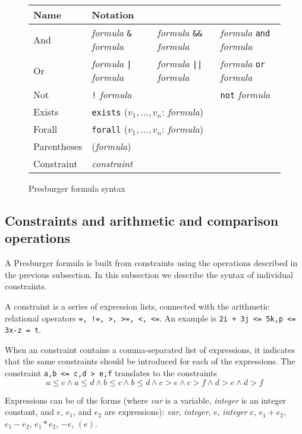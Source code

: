\begin{figure}[tbh]
\begin{tabular}{l|lll}
Name & \multicolumn{3}{l}{Notation} \\\hline

And & {\em formula} {\tt \&} {\em formula} & {\em formula} {\tt \&\&} {\em formula} & {\em formula} {\tt and} {\em formula} \\

Or  & {\em formula} {\tt |} {\em formula}  & {\em formula} {\tt ||} {\em formula}   & {\em formula} {\tt or} {\em formula} \\

Not & {\tt !} {\em formula}  &                    & {\tt not} {\em formula}\\

Exists & \multicolumn{3}{l}{{\tt exists} ($v_1,...,v_n$: {\em formula})} \\

Forall & \multicolumn{3}{l}{{\tt forall} ($v_1,...,v_n$: {\em formula})} \\

Parentheses & ({\em formula}) \\
Constraint & {\em constraint} \\
\end{tabular}
\caption{Presburger formula syntax}
\label{FormulaOps}
\end{figure}


\subsection{Constraints and arithmetic and comparison operations}

A Presburger formula is built from constraints using the operations
described in the previous subsection.  In this subsection we describe
the syntax of individual constraints.

A constraint is a series of expression lists, connected with
the arithmetic relational operators {\tt =, !=, >, >=, <, <=}.
An example is {\tt 2i + 3j <= 5k,p <= 3x-z = t}.

When an constraint contains a comma-separated list of expressions, it
indicates that the same constraints should be introduced for each of
the expressions.  The constraint {\tt a,b <= c,d > e,f} translates to
the constraints
$$a \leq c \land a \leq d \land b \leq c \land b \leq d \land 
c > e \land c > f \land d > e \land d > f$$

Expressions can be of the forms (where {\em var} is a variable, 
{\em integer} is an integer constant, and $e$, $e_1$, and $e_2$ are 
expressions):
{\em var}, {\em integer}, $e$, {\em integer} $e$,
$e_1 + e_2$, $e_1 - e_2$, 
$e_1 \ast e_2$, $- e$, $(e)$.

